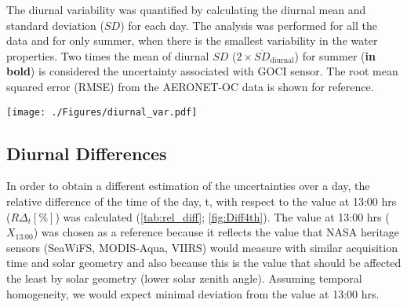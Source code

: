 \documentclass[remotesensing,article,submit,moreauthors,pdftex,10pt,a4paper]{Definitions/mdpi}
\begin{document}
  \begin{table}[htbp!]
  \caption{The diurnal variability was quantified by calculating the diurnal mean and standard deviation ($SD$) for each day. The analysis was performed for all the data and for only summer, when there is the smallest variability in the water properties. Two times the mean of diurnal $SD$ ($2\times \overline{SD}_\text{diurnal}$) for summer (\textbf{in bold}) is considered the uncertainty associated with GOCI sensor. The root mean squared error (RMSE) from the AERONET-OC data is shown for reference. \label{tab:diurnal_var} } 
  \centering
  \texttt{[image: ./Figures/diurnal\_var.pdf]}
  \end{table}

\subsection{Diurnal Differences}
In order to obtain a different estimation of the uncertainties over a day, the relative difference of the time of the day, t, with respect to the value at 13:00 hrs ($R\Delta_t[\%]$) was calculated (\autoref{tab:rel_diff}; \autoref{fig:Diff4th}). The value at 13:00 hrs ($X_\text{13:00}$) was chosen as a reference because it reflects the value that NASA heritage sensors (SeaWiFS, MODIS-Aqua, VIIRS) would measure with similar acquisition time and solar geometry and also because this is the value that should be affected the least by solar geometry (lower solar zenith angle). Assuming temporal homogeneity, we would expect minimal deviation from the value at 13:00 hrs. 
\end{document}
